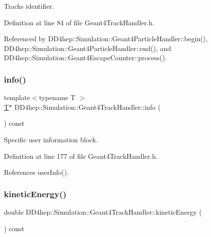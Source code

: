 Track\textquotesingle{}s identifier. 



Definition at line 84 of file Geant4\+Track\+Handler.\+h.



Referenced by D\+D4hep\+::\+Simulation\+::\+Geant4\+Particle\+Handler\+::begin(), D\+D4hep\+::\+Simulation\+::\+Geant4\+Particle\+Handler\+::end(), and D\+D4hep\+::\+Simulation\+::\+Geant4\+Escape\+Counter\+::process().

\hypertarget{class_d_d4hep_1_1_simulation_1_1_geant4_track_handler_a6d21a4b708c7cb447793cd442a87997f}{}\label{class_d_d4hep_1_1_simulation_1_1_geant4_track_handler_a6d21a4b708c7cb447793cd442a87997f} 
\subsubsection{\texorpdfstring{info()}{info()}}
{\footnotesize\ttfamily template$<$typename T $>$ \\
\hyperlink{class_t}{T}$\ast$ D\+D4hep\+::\+Simulation\+::\+Geant4\+Track\+Handler\+::info (\begin{DoxyParamCaption}{ }\end{DoxyParamCaption}) const\hspace{0.3cm}{\ttfamily [inline]}}



Specific user information block. 



Definition at line 177 of file Geant4\+Track\+Handler.\+h.



References user\+Info().

\hypertarget{class_d_d4hep_1_1_simulation_1_1_geant4_track_handler_a4e4e1b38fb592e189ac303a6ef19f0cf}{}\label{class_d_d4hep_1_1_simulation_1_1_geant4_track_handler_a4e4e1b38fb592e189ac303a6ef19f0cf} 
\subsubsection{\texorpdfstring{kinetic\+Energy()}{kineticEnergy()}}
{\footnotesize\ttfamily double D\+D4hep\+::\+Simulation\+::\+Geant4\+Track\+Handler\+::kinetic\+Energy (\begin{DoxyParamCaption}{ }\end{DoxyParamCaption}) const\hspace{0.3cm}{\ttfamily [inline]}}



